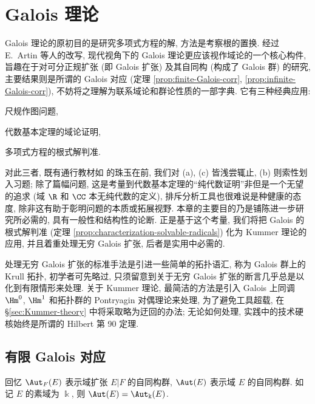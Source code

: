 
\chapter{Galois 理论}\label{sec:Galois}
Galois 理论的原初目的是研究多项式方程的解, 方法是考察根的置换. 经过 E.\ Artin 等人的改写, 现代视角下的 Galois 理论更应该视作域论的一个核心构件, 旨趣在于对可分正规扩张 (即 Galois 扩张) 及其自同构 (构成了 Galois 群) 的研究, 主要结果则是所谓的 Galois 对应 (定理 \ref{prop:finite-Galois-corr}, \ref{prop:infinite-Galois-corr}), 不妨将之理解为联系域论和群论性质的一部字典. 它有三种经典应用:
\begin{compactenum}[(a)]
	\item 尺规作图问题,
	\item 代数基本定理的域论证明,
	\item 多项式方程的根式解判准.
\end{compactenum}
对此三者, 既有通行教材如 \cite{ZhP} 的珠玉在前, 我们对 (a), (c) 皆浅尝辄止, (b) 则索性划入习题; 除了篇幅问题, 这是考量到代数基本定理的``纯代数证明''非但是一个无望的追求 (域 $\R$ 和 $\CC$ 本无纯代数的定义), 排斥分析工具也很难说是种健康的态度, 除非这有助于彰明问题的本质或拓展视野. 本章的主要目的乃是铺陈进一步研究所必需的, 具有一般性和结构性的论断. 正是基于这个考量, 我们将把 Galois 的根式解判准 (定理 \ref{prop:characterization-solvable-radicals}) 化为 Kummer 理论的应用, 并且着重处理无穷 Galois 扩张, 后者是实用中必需的.

\begin{wenxintishi}
	处理无穷 Galois 扩张的标准手法是引进一些简单的拓扑语汇, 称为 Galois 群上的 Krull 拓扑, 初学者可先略过, 只须留意到关于无穷 Galois 扩张的断言几乎总是以化到有限情形来处理. 关于 Kummer 理论, 最简洁的方法是引入 Galois 上同调 $\Hm^0$, $\Hm^1$ 和拓扑群的 Pontryagin 对偶理论来处理, 为了避免工具超载, 在 \S\ref{sec:Kummer-theory} 中将采取略为迂回的办法; 无论如何处理, 实践中的技术硬核始终是所谓的 Hilbert 第 90 定理.
\end{wenxintishi}

\section{有限 Galois 对应}
回忆 $\Aut_F(E)$ 表示域扩张 $E|F$ 的自同构群, $\Aut(E)$ 表示域 $E$ 的自同构群. 如记 $E$ 的素域为 $\Bbbk$, 则 $\Aut(E) = \Aut_\Bbbk(E)$.

